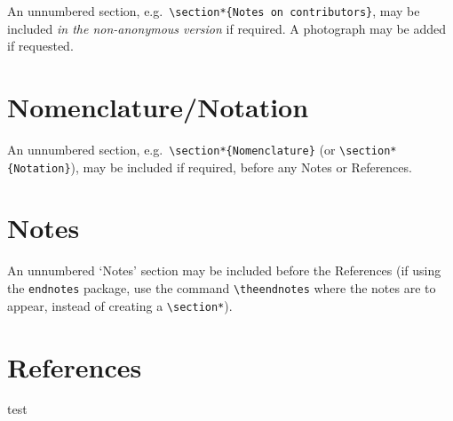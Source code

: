 \documentclass[]{interact}
\theoremstyle{plain}%
\theoremstyle{definition}
\theoremstyle{remark}
\begin{document}
An unnumbered section, e.g.\ \verb"\section*{Notes on contributors}", may be included \emph{in the non-anonymous version} if required. A photograph may be added if requested.


\section*{Nomenclature/Notation}

An unnumbered section, e.g.\ \verb"\section*{Nomenclature}" (or \verb"\section*{Notation}"), may be included if required, before any Notes or References.


\section*{Notes}

An unnumbered `Notes' section may be included before the References (if using the \verb"endnotes" package, use the command \verb"\theendnotes" where the notes are to appear, instead of creating a \verb"\section*").


\section{References}

test\citep{quEffectsSandBurial2017}



\end{document}
